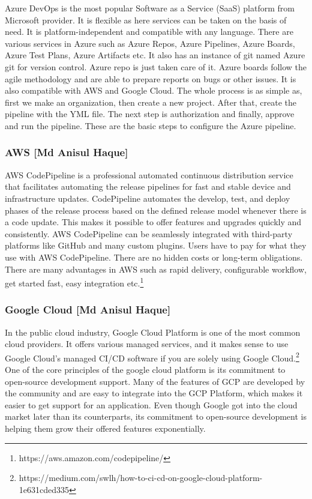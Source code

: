 Azure DevOps is the most popular Software as a Service (SaaS) platform from Microsoft provider. It is flexible as here services can be taken on the basis of need. It is platform-independent and compatible with any language. There are various services in Azure such as Azure Repos, Azure Pipelines, Azure Boards, Azure Test Plans, Azure Artifacts etc. It also has an instance of git named Azure git for version control. Azure repo is just taken care of it. Azure boards follow the agile methodology and are able to prepare reports on bugs or other issues. It is also compatible with AWS and Google Cloud. The whole process is as simple as, first we make an organization, then create a new project. After that, create the pipeline with the YML file. The next step is authorization and finally, approve and run the pipeline. These are the basic steps to configure the Azure pipeline.

%
\subsubsection{AWS [Md Anisul Haque]}
%

AWS CodePipeline is a professional automated continuous distribution service that facilitates automating the release pipelines for fast and stable device and infrastructure updates. CodePipeline automates the develop, test, and deploy phases of the release process based on the defined release model whenever there is a code update. This makes it possible to offer features and upgrades quickly and consistently. AWS CodePipeline can be seamlessly integrated with third-party platforms like GitHub and many custom plugins. Users have to pay for what they use with AWS CodePipeline. There are no hidden costs or long-term obligations. There are many advantages in AWS such as rapid delivery, configurable workflow, get started fast, easy integration etc.\footnote{https://aws.amazon.com/codepipeline/}

%
\subsubsection{Google Cloud [Md Anisul Haque]}
%
In the public cloud industry, Google Cloud Platform is one of the most common cloud providers. It offers various managed services, and it makes sense to use Google Cloud's managed CI/CD software if you are solely using Google Cloud.\footnote{https://medium.com/swlh/how-to-ci-cd-on-google-cloud-platform-1e631cded335} One of the core principles of the google cloud platform is its commitment to open-source development support. Many of the features of GCP are developed by the community and are easy to integrate into the GCP Platform, which makes it easier to get support for an application. Even though Google got into the cloud market later than its counterparts, its commitment to open-source development is helping them grow their offered features exponentially.  
%

